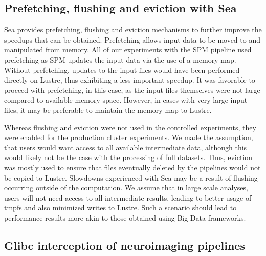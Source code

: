 \documentclass[fleqn,10pt]{wlscirep}
\begin{document}
    
    \subsection{Prefetching, flushing and eviction with Sea}

    Sea provides prefetching, flushing and eviction mechanisms to further
    improve the speedups that can be obtained. Prefetching allows input data to
    be moved to and manipulated from memory. All of our experiments with the SPM pipeline
    used prefetching as SPM updates the input data via the use of a memory map.
    Without prefetching, updates to the input files would have been performed
    directly on Lustre, thus exhibiting a less important speedup. It was
    favorable to proceed with prefetching, in this case, as the input files
    themselves were not large compared to available memory space. However, in
    cases with very large input files, it may be preferable to maintain the
    memory map to Lustre.

    Whereas flushing and eviction were not used in the controlled experiments,
    they were enabled for the production cluster experiments. We made the assumption, that
    users would want access to all available intermediate data, although this
    would likely not be the case with the processing of full datasets. Thus,
    eviction was mostly used to ensure that files eventually deleted by the
    pipelines would not be copied to Lustre. Slowdowns experienced with Sea may
    be a result of flushing occurring outside of the computation. We assume that
    in large scale analyses, users will not need access to all intermediate
    results, leading to better usage of tmpfs and also minimized writes to
    Lustre. Such a scenario should lead to performance results more akin to
    those obtained using Big Data frameworks.

    \subsection{Glibc interception of neuroimaging pipelines}
    
\end{document}
